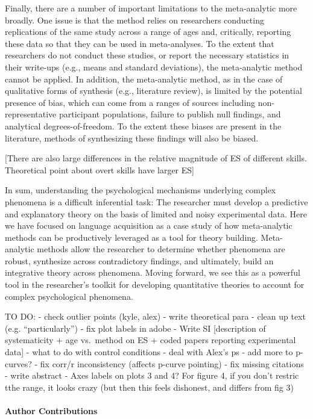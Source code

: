 \documentclass[english,floatsintext,man]{apa6}
\newcounter{author}
\begin{document}
Finally, there are a number of important limitations to the
meta-analytic more broadly. One issue is that the method relies on
researchers conducting replications of the same study across a range of
ages and, critically, reporting these data so that they can be used in
meta-analyses. To the extent that researchers do not conduct these
studies, or report the necessary statistics in their write-ups (e.g.,
means and standard deviations), the meta-analytic method cannot be
applied. In addition, the meta-analytic method, as in the case of
qualitative forms of synthesis (e.g., literature review), is limited by
the potential presence of bias, which can come from a ranges of sources
including non-representative participant populations, failure to publish
null findings, and analytical degrees-of-freedom. To the extent these
biases are present in the literature, methods of synthesizing these
findings will also be biased.

{[}There are also large differences in the relative magnitude of ES of
different skills. Theoretical point about overt skills have larger ES{]}

In sum, understanding the psychological mechanisms underlying complex
phenomena is a difficult inferential task: The researcher must develop a
predictive and explanatory theory on the basis of limited and noisy
experimental data. Here we have focused on language acquisition as a
case study of how meta-analytic methods can be productively leveraged as
a tool for theory building. Meta-analytic methods allow the researcher
to determine whether phenomena are robust, synthesize across
contradictory findings, and ultimately, build an integrative theory
across phenomena. Moving forward, we see this as a powerful tool in the
researcher's toolkit for developing quantitative theories to account for
complex psychological phenomena.

TO DO: - check outlier points (kyle, alex) - write theoretical para -
clean up text (e.g. \enquote{particularly}) - fix plot labels in adobe -
Write SI {[}description of systematicity + age vs.~method on ES + coded
papers reporting experimental data{]} - what to do with control
conditions - deal with Alex's ps - add more to p-curves? - fix corr/r
inconsistency (affects p-curve pointing) - fix missing citations - write
abstract - Axes labels on plots 3 and 4? For figure 4, if you don't
restric tthe range, it looks crazy (but then this feels dishonest, and
differs from fig 3)

\paragraph{Author Contributions}\label{author-contributions}
\end{document}
